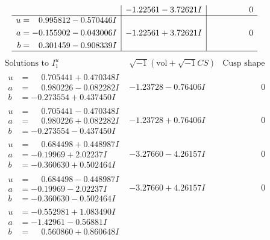 \documentclass[1p]{elsarticle_modified}
\theoremstyle{definition}
\newcommand{\I}{\sqrt{-1}}
\begin{document}
$$\begin{array}{c|c|c}
 & -1.22561 - 3.72621 I & \phantom{-0.000000 } 0 \\ \hline\begin{aligned}
u &= \phantom{-}0.995812 - 0.570446 I \\
a &= -0.155902 - 0.043006 I \\
b &= \phantom{-}0.301459 - 0.908339 I\end{aligned}
 & -1.22561 + 3.72621 I & \phantom{-0.000000 } 0\\
 \hline 
 \end{array}$$\newpage$$\begin{array}{c|c|c}  
\text{Solutions to }I^u_{1}& \I (\text{vol} + \sqrt{-1}CS) & \text{Cusp shape}\\
 \hline 
\begin{aligned}
u &= \phantom{-}0.705441 + 0.470348 I \\
a &= \phantom{-}0.980226 - 0.082282 I \\
b &= -0.273554 + 0.437450 I\end{aligned}
 & -1.23728 - 0.76406 I & \phantom{-0.000000 } 0 \\ \hline\begin{aligned}
u &= \phantom{-}0.705441 - 0.470348 I \\
a &= \phantom{-}0.980226 + 0.082282 I \\
b &= -0.273554 - 0.437450 I\end{aligned}
 & -1.23728 + 0.76406 I & \phantom{-0.000000 } 0 \\ \hline\begin{aligned}
u &= \phantom{-}0.684498 + 0.448987 I \\
a &= -0.19969 + 2.02237 I \\
b &= -0.360630 + 0.502464 I\end{aligned}
 & -3.27660 - 4.26157 I & \phantom{-0.000000 } 0 \\ \hline\begin{aligned}
u &= \phantom{-}0.684498 - 0.448987 I \\
a &= -0.19969 - 2.02237 I \\
b &= -0.360630 - 0.502464 I\end{aligned}
 & -3.27660 + 4.26157 I & \phantom{-0.000000 } 0 \\ \hline\begin{aligned}
u &= -0.552981 + 1.083490 I \\
a &= -1.42961 - 0.56881 I \\
b &= \phantom{-}0.560860 + 0.860648 I\end{aligned}

\end{array}$$
\end{document}
